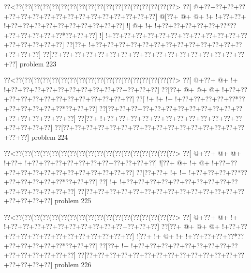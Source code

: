 \vbox{\vbox{\goo
\0??<\0??(\0??(\0??(\0??(\0??(\0??(\0??(\0??(\0??(\0??(\0??(\0??(\0??(\0??(\0??(\0??(\0??(\0??>
\0??[\- @+\0??+\0??+\0??+\0??+\0??+\0??+\0??+\0??+\0??+\0??+\0??+\0??+\0??+\0??+\0??+\0??+\0??]
\- @[\0??+\- @+\- @+\- !+\- !+\0??+\0??+\- !+\0??+\0??+\0??+\0??+\0??+\0??+\0??+\0??+\0??+\0??]
\- ![\- @+\- !+\- !+\0??+\0??+\0??+\0??+\0??+\0??*\0??+\0??+\0??+\0??+\0??+\0??*\0??+\0??+\0??]
\- ![\- !+\0??+\0??+\0??+\0??+\0??+\0??+\0??+\0??+\0??+\0??+\0??+\0??+\0??+\0??+\0??+\0??+\0??]
\0??[\0??+\- !+\0??+\0??+\0??+\0??+\0??+\0??+\0??+\0??+\0??+\0??+\0??+\0??+\0??+\0??+\0??+\0??]
\0??[\0??+\0??+\0??+\0??+\0??+\0??+\0??+\0??+\0??+\0??+\0??+\0??+\0??+\0??+\0??+\0??+\0??+\0??]
}
\hfil problem 223\hfil\break
}



\vbox{\vbox{\goo
\0??<\0??(\0??(\0??(\0??(\0??(\0??(\0??(\0??(\0??(\0??(\0??(\0??(\0??(\0??(\0??(\0??(\0??(\0??>
\0??[\- @+\0??+\- @+\- !+\- !+\0??+\0??+\0??+\0??+\0??+\0??+\0??+\0??+\0??+\0??+\0??+\0??+\0??]
\0??[\0??+\- @+\- @+\- @+\- !+\0??+\0??+\0??+\0??+\0??+\0??+\0??+\0??+\0??+\0??+\0??+\0??+\0??]
\0??[\- !+\- !+\- !+\- !+\0??+\0??+\0??+\0??+\0??*\0??+\0??+\0??+\0??+\0??+\0??*\0??+\0??+\0??]
\0??[\0??+\0??+\0??+\0??+\0??+\0??+\0??+\0??+\0??+\0??+\0??+\0??+\0??+\0??+\0??+\0??+\0??+\0??]
\0??[\0??+\- !+\0??+\0??+\0??+\0??+\0??+\0??+\0??+\0??+\0??+\0??+\0??+\0??+\0??+\0??+\0??+\0??]
\0??[\0??+\0??+\0??+\0??+\0??+\0??+\0??+\0??+\0??+\0??+\0??+\0??+\0??+\0??+\0??+\0??+\0??+\0??]
}
\hfil problem 224\hfil\break
}



\vbox{\vbox{\goo
\0??<\0??(\0??(\0??(\0??(\0??(\0??(\0??(\0??(\0??(\0??(\0??(\0??(\0??(\0??(\0??(\0??(\0??(\0??>
\0??[\- @+\0??+\- @+\- @+\- !+\0??+\- !+\0??+\0??+\0??+\0??+\0??+\0??+\0??+\0??+\0??+\0??+\0??]
\- ![\0??+\- @+\- !+\- @+\- !+\0??+\0??+\0??+\0??+\0??+\0??+\0??+\0??+\0??+\0??+\0??+\0??+\0??]
\0??[\0??+\0??+\- !+\- !+\- !+\0??+\0??+\0??+\0??*\0??+\0??+\0??+\0??+\0??+\0??*\0??+\0??+\0??]
\0??[\- !+\- !+\0??+\0??+\0??+\0??+\0??+\0??+\0??+\0??+\0??+\0??+\0??+\0??+\0??+\0??+\0??+\0??]
\0??[\0??+\0??+\0??+\0??+\0??+\0??+\0??+\0??+\0??+\0??+\0??+\0??+\0??+\0??+\0??+\0??+\0??+\0??]
}
\hfil problem 225\hfil\break
}



\vbox{\vbox{\goo
\0??<\0??(\0??(\0??(\0??(\0??(\0??(\0??(\0??(\0??(\0??(\0??(\0??(\0??(\0??(\0??(\0??(\0??(\0??>
\0??[\- @+\0??+\- @+\- !+\- !+\0??+\0??+\0??+\0??+\0??+\0??+\0??+\0??+\0??+\0??+\0??+\0??+\0??]
\0??[\0??+\- @+\- @+\- @+\- !+\0??+\0??+\0??+\0??+\0??+\0??+\0??+\0??+\0??+\0??+\0??+\0??+\0??]
\- ![\0??+\- !+\- @+\- !+\- !+\0??+\0??+\0??+\0??*\0??+\0??+\0??+\0??+\0??+\0??*\0??+\0??+\0??]
\0??[\0??+\- !+\- !+\0??+\0??+\0??+\0??+\0??+\0??+\0??+\0??+\0??+\0??+\0??+\0??+\0??+\0??+\0??]
\0??[\0??+\0??+\0??+\0??+\0??+\0??+\0??+\0??+\0??+\0??+\0??+\0??+\0??+\0??+\0??+\0??+\0??+\0??]
}
\hfil problem 226\hfil\break
}



